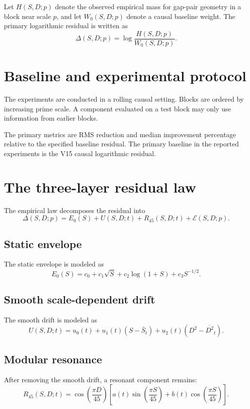 \documentclass[11pt]{article}
\begin{document}
Let \(H(S,D;p)\) denote the observed empirical mass for gap-pair geometry in a block near scale \(p\), and let \(W_0(S,D;p)\) denote a causal baseline weight. The primary logarithmic residual is written as
\[
\Delta(S,D;p)=\log\frac{H(S,D;p)}{W_0(S,D;p)}.
\]

\section{Baseline and experimental protocol}

The experiments are conducted in a rolling causal setting. Blocks are ordered by increasing prime scale. A component evaluated on a test block may only use information from earlier blocks.

The primary metrics are RMS reduction and median improvement percentage relative to the specified baseline residual. The primary baseline in the reported experiments is the V15 causal logarithmic residual.

\section{The three-layer residual law}

The empirical law decomposes the residual into
\[
\Delta(S,D;p)=E_0(S)+U(S,D;t)+R_{45}(S,D;t)+\mathcal{E}(S,D;p).
\]

\subsection{Static envelope}

The static envelope is modeled as
\[
E_0(S)=c_0+c_1\sqrt S+c_2\log(1+S)+c_3S^{-1/2}.
\]

\subsection{Smooth scale-dependent drift}

The smooth drift is modeled as
\[
U(S,D;t)=u_0(t)+u_1(t)(S-\bar S_t)+u_2(t)(D^2-\overline{D^2}_t).
\]

\subsection{Modular resonance}

After removing the smooth drift, a resonant component remains:
\[
R_{45}(S,D;t)
=
\cos\left(\frac{\pi D}{45}\right)
\left[
a(t)\sin\left(\frac{\pi S}{45}\right)
+
b(t)\cos\left(\frac{\pi S}{45}\right)
\right].
\]
\end{document}
